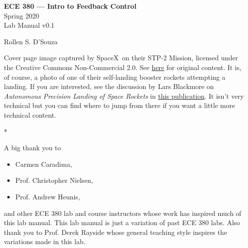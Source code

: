 \documentclass[letterpaper, 12pt, oneside]{memoir}
\begin{document}
\begin{titlingpage}
\vfill
\begin{flushright}
{
  \rmfamily\HUGE\noindent
  \textbf{ECE 380 --- Intro to Feedback Control}\\
  Spring 2020\\
  Lab Manual v0.1
}
\end{flushright}
\begin{flushright}
{
  \rmfamily\Large\noindent
  Rollen S. D'Souza
}
\end{flushright}
\vspace{0.25in}
\end{titlingpage}

\restoregeometry

\pagebreak

%
\thispagestyle{empty}

\noindent
Cover page image captured by SpaceX\textregistered~on their
STP-2 Mission, licensed under the Creative Commons Non-Commercial 2.0. See
\href{https://www.flickr.com/photos/spacex/48129269942/}{here}
for original content. It is, of course, a photo of one of their self-landing
booster rockets attempting a landing. If you are interested, see the discussion
by Lars Blackmore on \emph{Autonomous Precision Landing of Space Rockets}
in
\href{http://www.larsblackmore.com/nae_bridge_2016.pdf}{this publication}. It
isn't very technical but you can find where to jump from there if you want a
little more technical content.
\begin{center}
  * \qquad * \qquad *
\end{center}
\noindent
A big thank you to
\begin{itemize}[label={}]
  \item{Carmen Caradima,}
  \item{Prof. Christopher Nielsen,}
  \item{Prof. Andrew Heunis,}
\end{itemize}
and other ECE 380 lab and course instructors whose work has inspired much
of this lab manual. This lab manual is just a variation of past
ECE 380 labs. Also thank you to Prof. Derek Rayside whose general teaching
style inspires the variations made in this lab.
\end{document}
